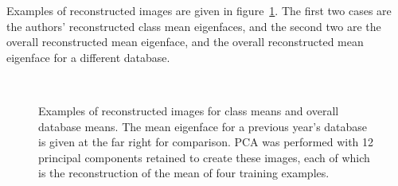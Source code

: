 Examples of reconstructed images are given in figure~\ref{fig:reconstructed-means}. The first two cases are the authors' reconstructed class mean eigenfaces, and the second two are the overall reconstructed mean eigenface, and the overall reconstructed mean eigenface for a different database.

\begin{figure}[htb]
 \centering
 \\
 \caption[Examples of reconstructed images]{Examples of reconstructed images for class means and overall database means. The mean eigenface for a previous year's database is given at the far right for comparison. PCA was performed with 12 principal components retained to create these images, each of which is the reconstruction of the mean of four training examples.}
 \label{fig:reconstructed-means}
\end{figure}

